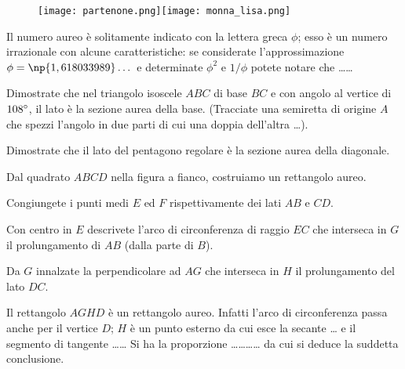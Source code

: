 \begin{figure*}[!htb]
	\centering\texttt{[image: partenone.png]}\qquad\texttt{[image: monna\_lisa.png]}
\end{figure*}

\begin{esercizio}
\label{ese:6.109}
Il numero aureo è solitamente indicato con la lettera greca $\phi$; esso è un numero irrazionale con alcune caratteristiche: se considerate l'approssimazione $\phi=\np{1,618033989}\ldots{}$ e determinate $\phi^2$ e $1/\phi$ potete notare che \ldots\ldots{}
\end{esercizio}

\begin{esercizio}
\label{ese:6.110}
Dimostrate che nel triangolo isoscele $ABC$ di base $BC$ e con angolo al vertice di $108{}^{\circ}$, il lato è la sezione aurea della base. (Tracciate una semiretta di origine $A$ che spezzi l'angolo in due parti di cui una doppia dell'altra \ldots{}).
\end{esercizio}

\begin{esercizio}
\label{ese:6.111}
Dimostrate che il lato del pentagono regolare è la sezione aurea della diagonale.
\end{esercizio}

\noindent\begin{minipage}{0.7\textwidth}\parindent15pt
\begin{esercizio}
\label{ese:6.112}
Dal quadrato $ABCD$ nella figura a fianco, costruiamo un rettangolo aureo.
\begin{enumerate*}
\item Congiungete i punti medi $E$ ed $F$ rispettivamente dei lati $AB$ e $CD$.
\item Con centro in $E$ descrivete l'arco di circonferenza di raggio $EC$ che interseca in $G$ il prolungamento di $AB$ (dalla parte di $B$).
\item Da $G$ innalzate la perpendicolare ad $AG$ che interseca in $H$ il prolungamento del lato $DC$.
\end{enumerate*}
Il rettangolo $AGHD$ è un rettangolo aureo. Infatti l'arco di circonferenza passa anche per il vertice $D$; $H$ è un punto esterno da cui esce la secante \ldots{} e il segmento di tangente \ldots\ldots{}
Si ha la proporzione \ldots\ldots\ldots\ldots{} da cui si deduce la suddetta conclusione.
\end{esercizio}
\end{minipage}\hfil
\begin{minipage}{0.3\textwidth}
	\centering
\end{minipage}
